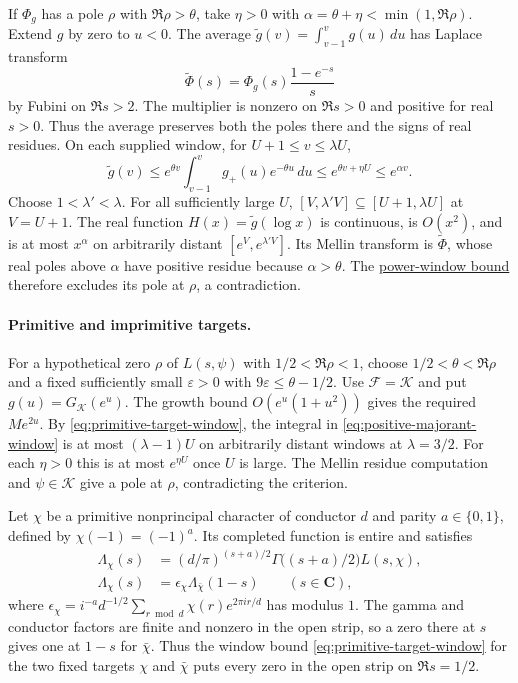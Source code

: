 If \(\Phi_g\) has a pole \(\rho\) with \(\Re\rho>\theta\), take
\(\eta>0\) with \(\alpha=\theta+\eta<\min(1,\Re\rho)\).
Extend \(g\) by zero to \(u<0\). The average
\(\widetilde g(v)=\int_{v-1}^v g(u)\,du\) has Laplace transform
\[
 \widetilde\Phi(s)=\Phi_g(s)\frac{1-e^{-s}}{s}
\]
by Fubini on \(\Re s>2\). The multiplier is nonzero on \(\Re s>0\)
and positive for real \(s>0\). Thus the average preserves both the
poles there and the signs of real residues. On each supplied window,
for \(U+1\le v\le\lambda U\),
\[
 \widetilde g(v)\le
 e^{\theta v}\int_{v-1}^v g_+(u)e^{-\theta u}\,du
 \le e^{\theta v+\eta U}\le e^{\alpha v}.
\]
Choose \(1<\lambda'<\lambda\). For all sufficiently large \(U\),
\([V,\lambda' V]\subseteq[U+1,\lambda U]\) at \(V=U+1\).
The real function \(H(x)=\widetilde g(\log x)\) is continuous, is
\(O(x^2)\), and is at most \(x^\alpha\) on arbitrarily distant
\([e^V,e^{\lambda' V}]\). Its Mellin transform is
\(\widetilde\Phi\), whose real poles above \(\alpha\) have positive
residue because \(\alpha>\theta\). The
\hyperlink{proof.one-sided-power-window-bound}{power-window bound}
therefore excludes its pole at \(\rho\), a contradiction.

\paragraph{Primitive and imprimitive targets.}
For a hypothetical zero \(\rho\) of \(L(s,\psi)\) with
\(1/2<\Re\rho<1\), choose \(1/2<\theta<\Re\rho\) and a fixed
sufficiently small \(\varepsilon>0\) with \(9\varepsilon\le\theta-1/2\).
Use \(\mathcal F=\mathcal K\) and put \(g(u)=G_{\mathcal K}(e^u)\).
The growth bound \(O(e^u(1+u^2))\) gives the required \(Me^{2u}\).
By \eqref{eq:primitive-target-window}, the integral in
\eqref{eq:positive-majorant-window} is at most \((\lambda-1)U\)
on arbitrarily distant windows at \(\lambda=3/2\).
For each \(\eta>0\) this is at most \(e^{\eta U}\) once \(U\)
is large. The Mellin residue computation and \(\psi\in\mathcal K\)
give a pole at \(\rho\), contradicting the criterion.

Let \(\chi\) be a primitive nonprincipal character of conductor \(d\)
and parity \(a\in\{0,1\}\), defined by \(\chi(-1)=(-1)^a\). Its
completed function is entire and satisfies
\begin{equation}
\label{eq:primitive-functional-equation}
 \begin{aligned}
 \Lambda_\chi(s)&=(d/\pi)^{(s+a)/2}\Gamma\bigl((s+a)/2\bigr)L(s,\chi),\\
 \Lambda_\chi(s)&=\epsilon_\chi\Lambda_{\bar\chi}(1-s)
       \qquad(s\in\mathbf C),
 \end{aligned}
\end{equation}
where \(\epsilon_\chi=i^{-a}d^{-1/2}\sum_{r\bmod d}\chi(r)e^{2\pi i r/d}\)
has modulus \(1\).
\cite[(10.17) and Cor.~10.8]{z6montgomery-vaughan}
The gamma and conductor factors are finite and nonzero in the open
strip, so a zero there at \(s\) gives one at \(1-s\) for \(\bar\chi\).
Thus the window bound \eqref{eq:primitive-target-window} for the two
fixed targets \(\chi\) and \(\bar\chi\) puts every zero in the open
strip on \(\Re s=1/2\).

